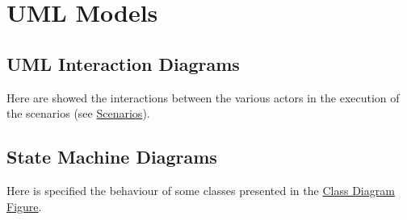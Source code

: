 \section{UML Models}

		
        

        
                        
		\subsection{UML Interaction Diagrams}
		Here are showed the interactions between the various actors in the execution of the scenarios (see \hyperref[sec:SectionScenarios]{Scenarios}).

			

			

			

			

			

			

			

			

			
			
			

			

			

			

			

		\subsection{State Machine Diagrams}
		Here is specified the behaviour of some classes presented in the \hyperref[sec:ClassDiagramFigure]{Class Diagram Figure}.

			

